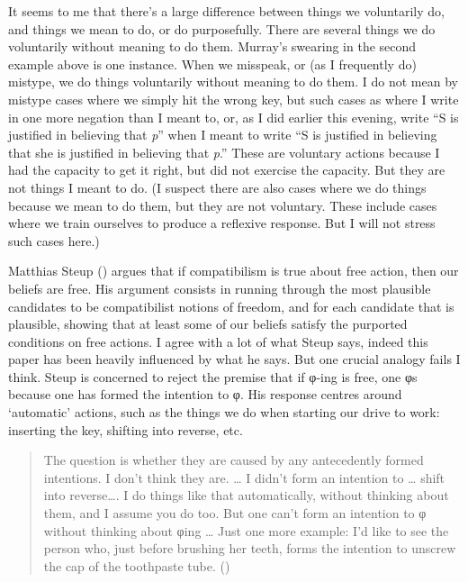 \documentclass[
  10pt,
  letterpaper,
  DIV=11,
  numbers=noendperiod,
  twoside]{scrartcl}
\begin{document}
It seems to me that there's a large difference between things we
voluntarily do, and things we mean to do, or do purposefully. There are
several things we do voluntarily without meaning to do them. Murray's
swearing in the second example above is one instance. When we misspeak,
or (as I frequently do) mistype, we do things voluntarily without
meaning to do them. I do not mean by mistype cases where we simply hit
the wrong key, but such cases as where I write in one more negation than
I meant to, or, as I did earlier this evening, write ``S is justified in
believing that \emph{p}'' when I meant to write ``S is justified in
believing that she is justified in believing that \emph{p}.'' These are
voluntary actions because I had the capacity to get it right, but did
not exercise the capacity. But they are not things I meant to do. (I
suspect there are also cases where we do things because we mean to do
them, but they are not voluntary. These include cases where we train
ourselves to produce a reflexive response. But I will not stress such
cases here.)

Matthias Steup () argues that if
compatibilism is true about free action, then our beliefs are free. His
argument consists in running through the most plausible candidates to be
compatibilist notions of freedom, and for each candidate that is
plausible, showing that at least some of our beliefs satisfy the
purported conditions on free actions. I agree with a lot of what Steup
says, indeed this paper has been heavily influenced by what he says. But
one crucial analogy fails I think. Steup is concerned to reject the
premise that if φ-ing is free, one φs because one has formed the
intention to φ. His response centres around `automatic' actions, such as
the things we do when starting our drive to work: inserting the key,
shifting into reverse, etc.

\begin{quote}
The question is whether they are caused by any antecedently formed
intentions. I don't think they are. \ldots{} I didn't form an intention
to \ldots{} shift into reverse\ldots. I do things like that
automatically, without thinking about them, and I assume you do too. But
one can't form an intention to φ without thinking about φing \ldots{}
Just one more example: I'd like to see the person who, just before
brushing her teeth, forms the intention to unscrew the cap of the
toothpaste tube. ()
\end{quote}
\end{document}

